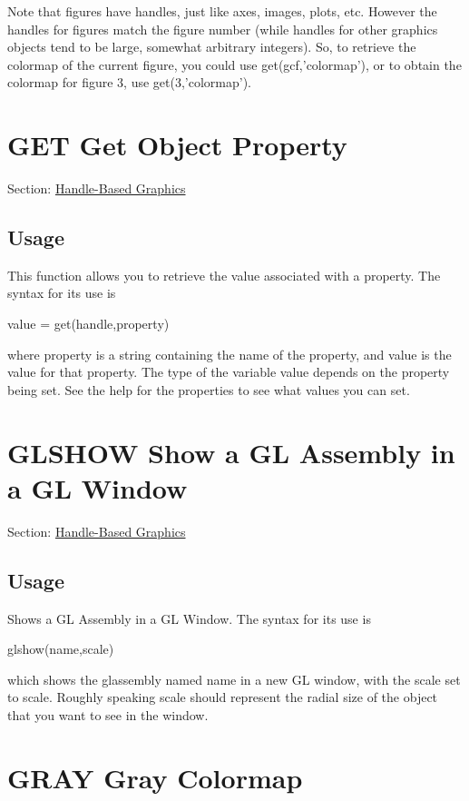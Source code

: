 Note that figures have handles, just like axes, images, plots, etc. However the handles for figures match the figure number (while handles for other graphics objects tend to be large, somewhat arbitrary integers). So, to retrieve the colormap of the current figure, you could use {\ttfamily get(gcf,'colormap')}, or to obtain the colormap for figure 3, use {\ttfamily get(3,'colormap')}. \hypertarget{handle_get}{}\section{G\-E\-T Get Object Property}\label{handle_get}
Section\-: \hyperlink{sec_handle}{Handle-\/\-Based Graphics} \hypertarget{vtkwidgets_vtkxyplotwidget_Usage}{}\subsection{Usage}\label{vtkwidgets_vtkxyplotwidget_Usage}
This function allows you to retrieve the value associated with a property. The syntax for its use is \begin{DoxyVerb}  value = get(handle,property)
\end{DoxyVerb}
 where {\ttfamily property} is a string containing the name of the property, and {\ttfamily value} is the value for that property. The type of the variable {\ttfamily value} depends on the property being set. See the help for the properties to see what values you can set. \hypertarget{handle_glshow}{}\section{G\-L\-S\-H\-O\-W Show a G\-L Assembly in a G\-L Window}\label{handle_glshow}
Section\-: \hyperlink{sec_handle}{Handle-\/\-Based Graphics} \hypertarget{vtkwidgets_vtkxyplotwidget_Usage}{}\subsection{Usage}\label{vtkwidgets_vtkxyplotwidget_Usage}
Shows a G\-L Assembly in a G\-L Window. The syntax for its use is \begin{DoxyVerb}  glshow(name,scale)
\end{DoxyVerb}
 which shows the {\ttfamily glassembly} named {\ttfamily name} in a new G\-L window, with the scale set to {\ttfamily scale}. Roughly speaking {\ttfamily scale} should represent the radial size of the object that you want to see in the window. \hypertarget{handle_gray}{}\section{G\-R\-A\-Y Gray Colormap}\label{handle_gray}
